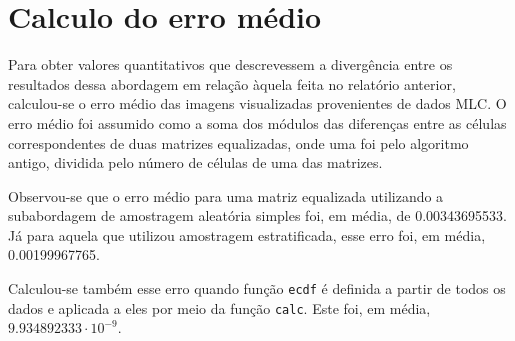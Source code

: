 \documentclass[12pt]{article}
\begin{document}
\newpage

\section{Calculo do erro médio}

Para obter valores quantitativos que descrevessem a divergência entre os resultados dessa abordagem em relação àquela feita no relatório anterior, calculou-se o erro médio das imagens visualizadas provenientes de dados MLC. O erro médio foi assumido como a soma dos módulos das diferenças entre as células correspondentes de duas matrizes equalizadas, onde uma foi pelo algoritmo antigo, dividida pelo número de células de uma das matrizes.

Observou-se que o erro médio para uma matriz equalizada utilizando a subabordagem de amostragem aleatória simples foi, em média, de 0.00343695533. Já para aquela que utilizou amostragem estratificada, esse erro foi, em média, 0.00199967765.

Calculou-se também esse erro quando função \texttt{ecdf} é definida a partir de todos os dados e aplicada a eles por meio da função \texttt{calc}. Este foi, em média, $9.934892333 \cdot 10^{-9}$.

%
%
\end{document}
